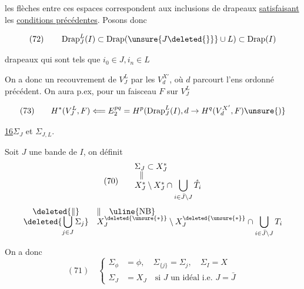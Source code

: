 les flèches entre ces espaces correspondent aux inclusions de drapeaux \uline{satisfaisant} les \uline{conditions précédentes}. Posons donc

\[
(72)\qquad\operatorname{Drap}_J^L(I)\subset\operatorname{Drap}(\unsure{J\deleted{\}}}\cup L)\subset\operatorname{Drap}(I)
\]

drapeaux  qui sont tels que $i_0\in J,i_n\in L$

On a donc un recouvrement de $V_J^L$ par les $V_d^{X'}$, où $d$ parcourt l'ens ordonné précédent. On aura p.ex, pour un faisceau $F$ sur $V_J^L$

\[
(73)\qquad H^*(V_J^L,F)\Longleftarrow E_2^{pq}=H^p(\operatorname{Drap}_J^L(I),d\to H^q(V_d^{X'},F)\unsure{)}
\]



\noindent\uline{16}\quad $\Sigma_J$ et $\Sigma_{J,L}$.


Soit $J$ une bande de $I$, on définit
\[
(70)\qquad
\begin{array}{@{}l@{}}
\Sigma_J\subset X_J^*\\[-.4ex]
\hspace{.6em}\Vert\\[-.4ex]
X_J^*\setminus X_J^*\cap\displaystyle\bigcup_{i\in\bar J\setminus J}\mathring T_i
\end{array}
\]
\[
\begin{array}{@{}c@{\quad}l@{}}
\deleted{\Vert}&\Vert\quad\text{\uline{NB}}\\[-.4ex]
\deleted{\displaystyle\bigcup_{j\in J}\Sigma_j}&
X_J^{\deleted{\unsure{*}}}\setminus X_J^{\deleted{\unsure{*}}}\cap\displaystyle\bigcup_{i\in\bar J\setminus J}T_i
\end{array}
\]

On a donc
\[
(71)\quad\left\{
\begin{aligned}
\Sigma_{\phi}&=\phi,\quad\Sigma_{\{j\}}=\Sigma_j,\quad\Sigma_I=X\\
\Sigma_J&=X_J\quad\text{si $J$ un idéal i.e. $J=\bar J$}
\end{aligned}\right.
\]

